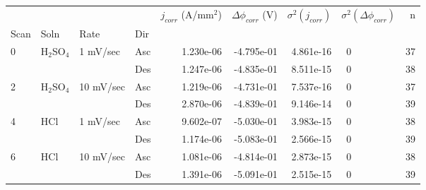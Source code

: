 \begin{tabular}{llllrrrlr}
\toprule
  &     &           &     &  $j_{corr}$ (A/mm$^2$) &  $\Delta \phi_{corr}$ (V) &  $\sigma^2(j_{corr})$ & $\sigma^2(\Delta \phi_{corr})$ &   n \\
Scan & Soln & Rate & Dir &                        &                           &                       &                                &     \\
\midrule
0 & H$_2$SO$_4$ & 1 mV/sec & Asc &              1.230e-06 &                -4.795e-01 &             4.861e-16 &                             ~0 &  37 \\
  &     &           & Des &              1.247e-06 &                -4.835e-01 &             8.511e-15 &                             ~0 &  38 \\
2 & H$_2$SO$_4$ & 10 mV/sec & Asc &              1.219e-06 &                -4.731e-01 &             7.537e-16 &                             ~0 &  37 \\
  &     &           & Des &              2.870e-06 &                -4.839e-01 &             9.146e-14 &                             ~0 &  39 \\
4 & HCl & 1 mV/sec & Asc &              9.602e-07 &                -5.030e-01 &             3.983e-15 &                             ~0 &  38 \\
  &     &           & Des &              1.174e-06 &                -5.083e-01 &             2.566e-15 &                             ~0 &  39 \\
6 & HCl & 10 mV/sec & Asc &              1.081e-06 &                -4.814e-01 &             2.873e-15 &                             ~0 &  38 \\
  &     &           & Des &              1.391e-06 &                -5.091e-01 &             2.515e-15 &                             ~0 &  39 \\
\bottomrule
\end{tabular}
